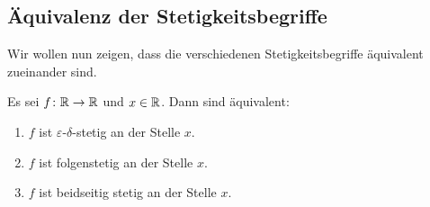 \documentclass[a4paper,10pt]{article}
\begin{document}
\subsection{Äquivalenz der Stetigkeitsbegriffe}


Wir wollen nun zeigen, dass die verschiedenen Stetigkeitsbegriffe äquivalent zueinander sind.


\begin{prop}
 Es sei $f \colon \mathbb{R} \to \mathbb{R}$ und $x \in \mathbb{R}$. Dann sind äquivalent:
 \begin{enumerate}
  \item\label{enum: epsilon-delta-stetig}
   $f$ ist $\varepsilon$-$\delta$-stetig an der Stelle $x$.
  \item\label{enum: folgenstetig}
   $f$ ist folgenstetig an der Stelle $x$.
  \item\label{enum: beidseitig stetig}
   $f$ ist beidseitig stetig an der Stelle $x$.
 \end{enumerate}
\end{prop}
\end{document}
